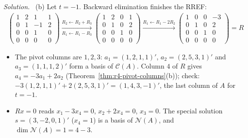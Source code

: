 \documentclass[12pt]{article}
\theoremstyle{definition}
\newenvironment{solution}{\par\noindent\textit{Solution.}\ }{\par\smallskip}
\begin{document}
\begin{solution}
(b) Let \(t=-1\). Backward elimination finishes the RREF:
\[
\begin{gathered}
\begin{pmatrix}1&2&1&1\\0&1&-1&2\\0&0&1&0\\0&0&0&0\end{pmatrix}
\xrightarrow[R_1\leftarrow R_1-R_3]{R_2\leftarrow R_2+R_3}
\begin{pmatrix}1&2&0&1\\0&1&0&2\\0&0&1&0\\0&0&0&0\end{pmatrix}
\xrightarrow{R_1\leftarrow R_1-2R_2}
\begin{pmatrix}1&0&0&-3\\0&1&0&2\\0&0&1&0\\0&0&0&0\end{pmatrix}=R
\end{gathered}
\]
\begin{itemize}
\item The pivot columns are \(1,2,3\): \(a_1=(1,2,1,1)'\), \(a_2=(2,5,3,1)'\) and \(a_3=(1,1,1,2)'\) form a basis of
\(\mathcal C(A)\). Column \(4\) of \(R\) gives \(a_4=-3a_1+2a_2\) (Theorem~\ref{thm:r4-pivot-columns}(b)); check:
\(-3(1,2,1,1)'+2(2,5,3,1)'=(1,4,3,-1)'\), the last column of \(A\) for \(t=-1\).
\item \(Rx=0\) reads \(x_1-3x_4=0\), \(x_2+2x_4=0\), \(x_3=0\). The special solution \(s=(3,-2,0,1)'\) (\(x_4=1\)) is a
basis of \(\mathcal N(A)\), and \(\dim\mathcal N(A)=1=4-3\).
\end{itemize}
\end{solution}
\end{document}

